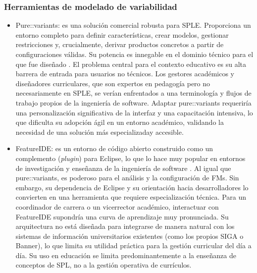 \subsubsection{Herramientas de modelado de variabilidad}

\begin{itemize}
    \item Pure::variants: es una solución comercial robusta para \ac{SPLE}. 
    Proporciona un entorno completo para definir
    características, crear modelos, gestionar restricciones y, crucialmente, derivar
    productos concretos a partir de configuraciones válidas. Su potencia es
    innegable en el dominio técnico para el que fue diseñado \citep{purevariants2024overview}. 
    El problema central para el contexto educativo es su alta barrera de entrada para usuarios no
    técnicos. Los gestores académicos y diseñadores curriculares, que son
    expertos en pedagogía pero no necesariamente en \ac{SPLE}, se verían enfrentados
    a una terminología y flujos de trabajo propios de la ingeniería de software.
    Adaptar pure::variants requeriría una personalización significativa de la
    interfaz y una capacitación intensiva, lo que dificulta su adopción ágil en un
    entorno académico, validando la necesidad de una solución más especializaday accesible.

    \item FeatureIDE: es un entorno de código abierto construido como un complemento (\textit{plugin}) para
    Eclipse, lo que lo hace muy popular en entornos de investigación y enseñanza
    de la ingeniería de software \citep{thum2014featureide}. Al igual que pure::variants, es poderoso para
    el análisis y la configuración de \ac{FM}s. Sin embargo, su
    dependencia de Eclipse y su orientación hacia desarrolladores lo convierten en
    una herramienta que requiere especialización técnica. Para un coordinador de
    carrera o un vicerrector académico, interactuar con FeatureIDE supondría una
    curva de aprendizaje muy pronunciada. Su arquitectura no está diseñada para
    integrarse de manera natural con los sistemas de información universitarios
    existentes (como los propios SIGA o Banner), lo que limita su utilidad práctica
    para la gestión curricular del día a día. Su uso en educación se limita
    predominantemente a la enseñanza de conceptos de \ac{SPL}, no a la gestión
    operativa de currículos.


\end{itemize}
